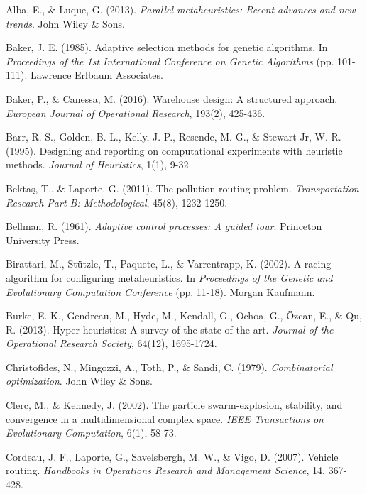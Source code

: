 \documentclass[12pt,a4paper]{article}
\begin{document}

\begin{thebibliography}{99}

Alba, E., \& Luque, G. (2013). \textit{Parallel metaheuristics: Recent advances and new trends}. John Wiley \& Sons.

Baker, J. E. (1985). Adaptive selection methods for genetic algorithms. In \textit{Proceedings of the 1st International Conference on Genetic Algorithms} (pp. 101-111). Lawrence Erlbaum Associates.

Baker, P., \& Canessa, M. (2016). Warehouse design: A structured approach. \textit{European Journal of Operational Research}, 193(2), 425-436.

Barr, R. S., Golden, B. L., Kelly, J. P., Resende, M. G., \& Stewart Jr, W. R. (1995). Designing and reporting on computational experiments with heuristic methods. \textit{Journal of Heuristics}, 1(1), 9-32.

Bektaş, T., \& Laporte, G. (2011). The pollution-routing problem. \textit{Transportation Research Part B: Methodological}, 45(8), 1232-1250.

Bellman, R. (1961). \textit{Adaptive control processes: A guided tour}. Princeton University Press.

Birattari, M., Stützle, T., Paquete, L., \& Varrentrapp, K. (2002). A racing algorithm for configuring metaheuristics. In \textit{Proceedings of the Genetic and Evolutionary Computation Conference} (pp. 11-18). Morgan Kaufmann.

Burke, E. K., Gendreau, M., Hyde, M., Kendall, G., Ochoa, G., Özcan, E., \& Qu, R. (2013). Hyper-heuristics: A survey of the state of the art. \textit{Journal of the Operational Research Society}, 64(12), 1695-1724.

Christofides, N., Mingozzi, A., Toth, P., \& Sandi, C. (1979). \textit{Combinatorial optimization}. John Wiley \& Sons.

Clerc, M., \& Kennedy, J. (2002). The particle swarm-explosion, stability, and convergence in a multidimensional complex space. \textit{IEEE Transactions on Evolutionary Computation}, 6(1), 58-73.

Cordeau, J. F., Laporte, G., Savelsbergh, M. W., \& Vigo, D. (2007). Vehicle routing. \textit{Handbooks in Operations Research and Management Science}, 14, 367-428.


\end{thebibliography}
\end{document}
